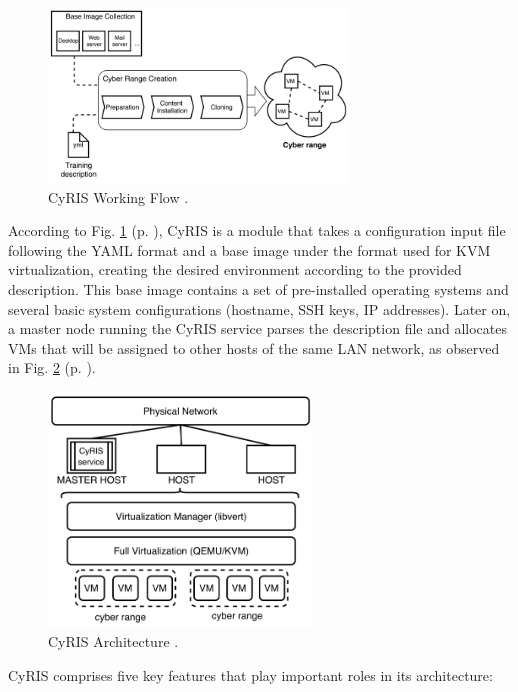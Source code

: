 \begin{figure}[H]
    \includegraphics[width=8cm]{figures/cyris_workflow.png}
    \caption{CyRIS Working Flow \cite{cyris_ref}.}
    \label{fig:cyris_workflow}
\end{figure}

According to Fig. \ref{fig:cyris_workflow} (p. \pageref{fig:cyris_workflow}), CyRIS is a module that takes a configuration input file following the YAML format and a base image under the format used for KVM virtualization, creating the desired environment according to the provided description. This base image contains a set of pre-installed operating systems and several basic system configurations (hostname, SSH keys, IP addresses). Later on, a master node running the CyRIS service parses the description file and allocates VMs that will be assigned to other hosts of the same LAN network, as observed in Fig. \ref{fig:cyris_architecture} (p. \pageref{fig:cyris_architecture}).

\begin{figure}[H]
    \includegraphics[width=7cm]{figures/cyris_architecture.png}
    \caption{CyRIS Architecture \cite{cyris_ref}.}
    \label{fig:cyris_architecture}
\end{figure}

CyRIS comprises five key features that play important roles in its architecture:


